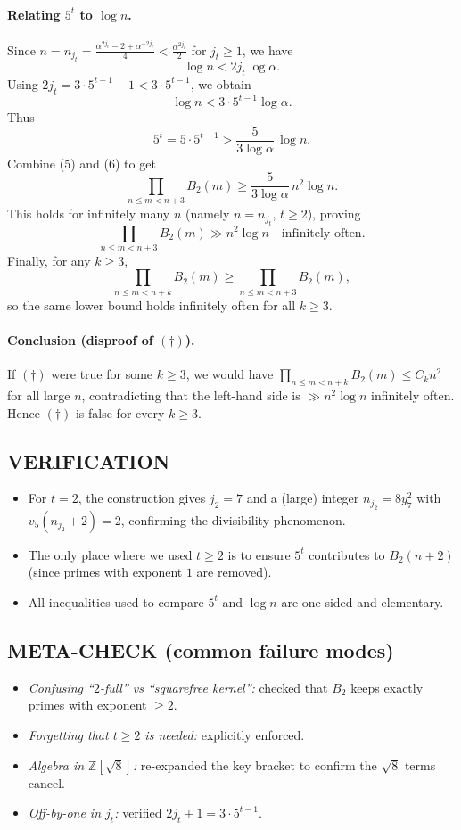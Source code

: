 \paragraph{Relating $5^t$ to $\log n$.}
Since $n=n_{j_t}=\frac{\alpha^{2j_t}-2+\alpha^{-2j_t}}{4}<\frac{\alpha^{2j_t}}{2}$ for $j_t\ge 1$, we have
\[
\log n < 2j_t\log\alpha.
\]
Using $2j_t=3\cdot 5^{t-1}-1<3\cdot 5^{t-1}$, we obtain
\[
\log n < 3\cdot 5^{t-1}\log\alpha.
\]
Thus
\[
5^t = 5\cdot 5^{t-1} > \frac{5}{3\log\alpha}\,\log n.
\tag{6}
\]
Combine (5) and (6) to get
\[
\prod_{n\le m<n+3} B_2(m) \ge \frac{5}{3\log\alpha}\, n^2\log n.
\]
This holds for infinitely many $n$ (namely $n=n_{j_t}$, $t\ge 2$), proving
\[
\prod_{n\le m<n+3} B_2(m) \gg n^2\log n\quad\text{infinitely often}.
\]
Finally, for any $k\ge 3$,
\[
\prod_{n\le m<n+k} B_2(m) \ge \prod_{n\le m<n+3} B_2(m),
\]
so the same lower bound holds infinitely often for all $k\ge 3$.

\paragraph{Conclusion (disproof of $(\dagger)$).}
If $(\dagger)$ were true for some $k\ge 3$, we would have $\prod_{n\le m<n+k}B_2(m)\le C_k n^2$ for all large $n$, contradicting that the left-hand side is $\gg n^2\log n$ infinitely often. Hence $(\dagger)$ is false for every $k\ge 3$.

\subsection*{VERIFICATION}
\begin{itemize}
\item For $t=2$, the construction gives $j_2=7$ and a (large) integer $n_{j_2}=8y_7^2$ with $v_5(n_{j_2}+2)=2$, confirming the divisibility phenomenon.
\item The only place where we used $t\ge 2$ is to ensure $5^t$ contributes to $B_2(n+2)$ (since primes with exponent $1$ are removed).
\item All inequalities used to compare $5^t$ and $\log n$ are one-sided and elementary.
\end{itemize}

\subsection*{META-CHECK (common failure modes)}
\begin{itemize}
\item \emph{Confusing ``$2$-full'' vs ``squarefree kernel'':} checked that $B_2$ keeps exactly primes with exponent $\ge 2$.
\item \emph{Forgetting that $t\ge 2$ is needed:} explicitly enforced.
\item \emph{Algebra in $\mathbb{Z}[\sqrt{8}]$:} re-expanded the key bracket to confirm the $\sqrt{8}$ terms cancel.
\item \emph{Off-by-one in $j_t$:} verified $2j_t+1=3\cdot 5^{t-1}$.
\end{itemize}

